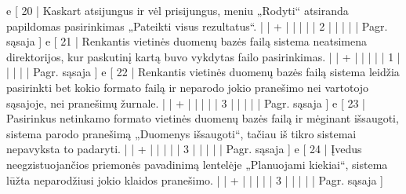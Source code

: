 {%
  e [ 20 | Kaskart atsijungus ir vėl prisijungus, meniu „Rodyti“ atsiranda papildomas 
  pasirinkimas „Pateikti visus rezultatus“.
                    |   | + |   |   |   |   | 2 |   |   |   |      | Pagr. sąsaja ]
  e [ 21 | Renkantis vietinės duomenų bazės failą sistema neatsimena direktorijos,
  kur paskutinį kartą buvo vykdytas failo pasirinkimas.
                    |   | + |   |   |   |   | 1 |   |   |   |      | Pagr. sąsaja ]
  e [ 22 | Renkantis vietinės duomenų bazės failą sistema leidžia pasirinkti bet kokio
  formato failą ir neparodo jokio pranešimo nei vartotojo sąsajoje, nei pranešimų 
  žurnale.
                    |   | + |   |   |   |   | 3 |   |   |   |      | Pagr. sąsaja ]
  e [ 23 | Pasirinkus netinkamo formato vietinės duomenų bazės failą ir mėginant 
  išsaugoti, sistema parodo pranešimą „Duomenys išsaugoti“, tačiau iš tikro sistemai 
  nepavyksta to padaryti.
                    |   | + |   |   |   |   | 3 |   |   |   |      | Pagr. sąsaja ]
  e [ 24 | Įvedus neegzistuojančios priemonės pavadinimą lentelėje „Planuojami kiekiai“,
  sistema lūžta neparodžiusi jokio klaidos pranešimo.
                    |   | + |   |   |   |   | 3 |   |   |   |      | Pagr. sąsaja ]
}
